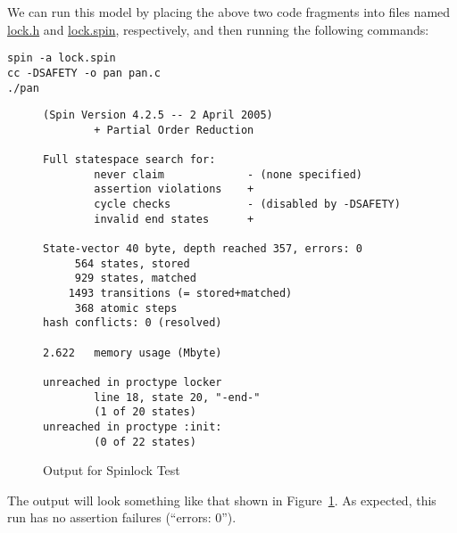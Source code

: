 We can run this model by placing the above two code fragments into
files named \url{lock.h} and \url{lock.spin}, respectively, and then running
the following commands:

\vspace{5pt}
\begin{minipage}[t]{\columnwidth}
\begin{verbatim}
spin -a lock.spin
cc -DSAFETY -o pan pan.c
./pan
\end{verbatim}
\end{minipage}
\vspace{5pt}

\begin{figure}[htbp]
{ \scriptsize
\begin{verbatim}
(Spin Version 4.2.5 -- 2 April 2005)
        + Partial Order Reduction

Full statespace search for:
        never claim             - (none specified)
        assertion violations    +
        cycle checks            - (disabled by -DSAFETY)
        invalid end states      +

State-vector 40 byte, depth reached 357, errors: 0
     564 states, stored
     929 states, matched
    1493 transitions (= stored+matched)
     368 atomic steps
hash conflicts: 0 (resolved)

2.622   memory usage (Mbyte)

unreached in proctype locker
        line 18, state 20, "-end-"
        (1 of 20 states)
unreached in proctype :init:
        (0 of 22 states)
\end{verbatim}
}
\caption{Output for Spinlock Test}
\label{fig:analysis:Output for Spinlock Test}
\end{figure}

The output will look something like that shown in
Figure~\ref{fig:analysis:Output for Spinlock Test}.
As expected, this run has no assertion failures (``errors: 0'').

 \QuickQuizEnd

 \QuickQuizEnd


